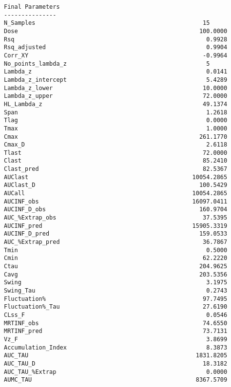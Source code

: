 \documentclass[12pt,a4paper]{article}
\begin{document}
\begin{verbatim}
Final Parameters
---------------
N_Samples                                                15
Dose                                                    100.0000
Rsq                                                       0.9928
Rsq_adjusted                                              0.9904
Corr_XY                                                  -0.9964
No_points_lambda_z                                        5
Lambda_z                                                  0.0141
Lambda_z_intercept                                        5.4289
Lambda_z_lower                                           10.0000
Lambda_z_upper                                           72.0000
HL_Lambda_z                                              49.1374
Span                                                      1.2618
Tlag                                                      0.0000
Tmax                                                      1.0000
Cmax                                                    261.1770
Cmax_D                                                    2.6118
Tlast                                                    72.0000
Clast                                                    85.2410
Clast_pred                                               82.5367
AUClast                                               10054.2865
AUClast_D                                               100.5429
AUCall                                                10054.2865
AUCINF_obs                                            16097.0411
AUCINF_D_obs                                            160.9704
AUC_%Extrap_obs                                          37.5395
AUCINF_pred                                           15905.3319
AUCINF_D_pred                                           159.0533
AUC_%Extrap_pred                                         36.7867
Tmin                                                      0.5000
Cmin                                                     62.2220
Ctau                                                    204.9625
Cavg                                                    203.5356
Swing                                                     3.1975
Swing_Tau                                                 0.2743
Fluctuation%                                             97.7495
Fluctuation%_Tau                                         27.6190
CLss_F                                                    0.0546
MRTINF_obs                                               74.6550
MRTINF_pred                                              73.7131
Vz_F                                                      3.8699
Accumulation_Index                                        8.3873
AUC_TAU                                                1831.8205
AUC_TAU_D                                                18.3182
AUC_TAU_%Extrap                                           0.0000
AUMC_TAU                                               8367.5709




\end{verbatim}
\end{document}

